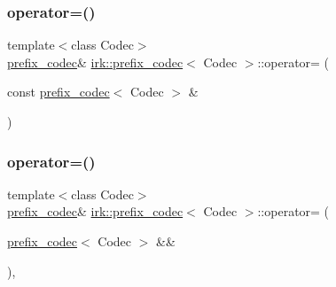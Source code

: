 \mbox{\label{classirk_1_1prefix__codec_aba7104bb2d148c766cce482aa8c2aefa}} 
\subsubsection{\texorpdfstring{operator=()}{operator=()}\hspace{0.1cm}{\footnotesize\ttfamily [1/2]}}
{\footnotesize\ttfamily template$<$class Codec$>$ \\
\mbox{\hyperlink{classirk_1_1prefix__codec}{prefix\+\_\+codec}}\& \mbox{\hyperlink{classirk_1_1prefix__codec}{irk\+::prefix\+\_\+codec}}$<$ Codec $>$\+::operator= (\begin{DoxyParamCaption}\item[{const \mbox{\hyperlink{classirk_1_1prefix__codec}{prefix\+\_\+codec}}$<$ Codec $>$ \&}]{ }\end{DoxyParamCaption})\hspace{0.3cm}{\ttfamily [default]}}

\mbox{\label{classirk_1_1prefix__codec_a4baa5529105e188218c1b181bd5e37bf}} 
\subsubsection{\texorpdfstring{operator=()}{operator=()}\hspace{0.1cm}{\footnotesize\ttfamily [2/2]}}
{\footnotesize\ttfamily template$<$class Codec$>$ \\
\mbox{\hyperlink{classirk_1_1prefix__codec}{prefix\+\_\+codec}}\& \mbox{\hyperlink{classirk_1_1prefix__codec}{irk\+::prefix\+\_\+codec}}$<$ Codec $>$\+::operator= (\begin{DoxyParamCaption}\item[{\mbox{\hyperlink{classirk_1_1prefix__codec}{prefix\+\_\+codec}}$<$ Codec $>$ \&\&}]{ }\end{DoxyParamCaption})\hspace{0.3cm}{\ttfamily [delete]}, {\ttfamily [noexcept]}}

\mbox{\label{classirk_1_1prefix__codec_afbc9b7767acb444e0cb8d9d4f6d83a23}} 

